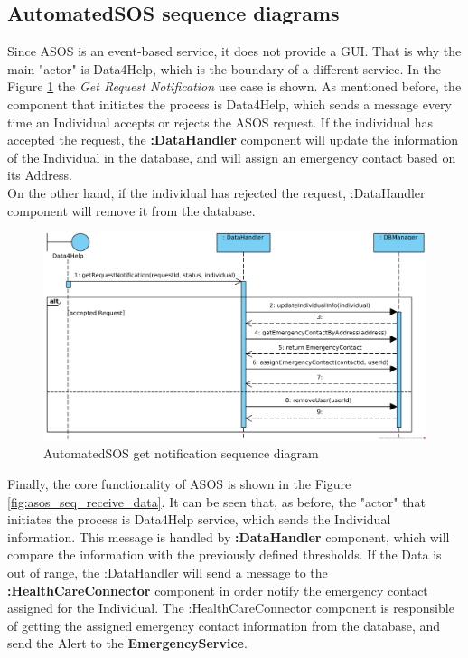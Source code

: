 \documentclass[a4paper, hidelinks, 12pt]{report}
\begin{document}
\begin{itemize}
	\subsection{AutomatedSOS sequence diagrams}
	Since ASOS is an event-based service, it does not provide a GUI. That is why the main "actor" is Data4Help, which is the boundary of a different service. In the Figure \ref{fig:asos_seq_get_notification} the \textit{Get Request Notification} use case is shown. As mentioned before, the component that initiates the process is Data4Help, which sends a message every time an Individual accepts or rejects the ASOS request. If the individual has accepted the request, the \textbf{:DataHandler} component will update the information of the Individual in the database, and will assign an emergency contact based on its Address.\\
	
	On the other hand, if the individual has rejected the request, :DataHandler component will remove it from the database.\\
	
	\begin{figure}[H]
		\centering
		\includegraphics[width=1\textwidth]{diagrams/sequence_diagrams/asos_get_individual_notification.png}
		\caption[AutomatedSOS get notification sequence diagram]{AutomatedSOS get notification sequence diagram}
		\label{fig:asos_seq_get_notification}
	\end{figure}
	
	Finally, the core functionality of ASOS is shown in the Figure \ref{fig:asos_seq_receive_data}. It can be seen that, as before, the "actor" that initiates the process is Data4Help service, which sends the Individual information. This message is handled by \textbf{:DataHandler} component, which will compare the information with the previously defined thresholds. If the Data is out of range, the :DataHandler will send a message to the \textbf{:HealthCareConnector} component in order notify the emergency contact assigned for the Individual. The :HealthCareConnector component is responsible of getting the assigned emergency contact information from the database, and send the Alert to the \textbf{EmergencyService}.\\
	

\end{itemize}
\end{document}
